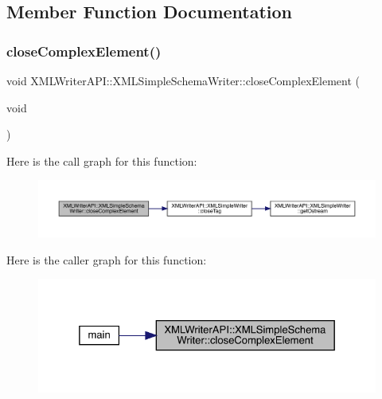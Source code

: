 \subsection{Member Function Documentation}
\mbox{\label{classXMLWriterAPI_1_1XMLSimpleSchemaWriter_a48be6d4cbc08f03e9e76fa94107c4b8a}} 
\subsubsection{\texorpdfstring{closeComplexElement()}{closeComplexElement()}\hspace{0.1cm}{\footnotesize\ttfamily [1/3]}}
{\footnotesize\ttfamily void X\+M\+L\+Writer\+A\+P\+I\+::\+X\+M\+L\+Simple\+Schema\+Writer\+::close\+Complex\+Element (\begin{DoxyParamCaption}\item[{void}]{ }\end{DoxyParamCaption})\hspace{0.3cm}{\ttfamily [inline]}}

Here is the call graph for this function\+:
\nopagebreak
\begin{figure}[H]
\begin{center}
\leavevmode
\includegraphics[width=350pt]{db/d0b/classXMLWriterAPI_1_1XMLSimpleSchemaWriter_a48be6d4cbc08f03e9e76fa94107c4b8a_cgraph}
\end{center}
\end{figure}
Here is the caller graph for this function\+:
\nopagebreak
\begin{figure}[H]
\begin{center}
\leavevmode
\includegraphics[width=325pt]{db/d0b/classXMLWriterAPI_1_1XMLSimpleSchemaWriter_a48be6d4cbc08f03e9e76fa94107c4b8a_icgraph}
\end{center}
\end{figure}
\mbox{\label{classXMLWriterAPI_1_1XMLSimpleSchemaWriter_a48be6d4cbc08f03e9e76fa94107c4b8a}} 

